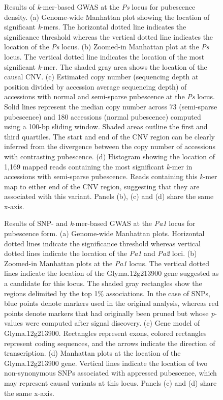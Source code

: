 \documentclass{article}
\begin{document}
\begin{figure}[p]
	\caption[Results of \textit{k}-mer-based GWAS at the
	\textit{Ps} locus for pubescence density.]{Results of \textit{k}-mer-based GWAS at the
	\textit{Ps} locus for pubescence density.
	(a) Genome-wide Manhattan plot showing the location of significant \textit{k}-mers. The
	horizontal dotted line indicates the significance threshold whereas the
	vertical dotted line indicates the location of the \textit{Ps} locus.
	(b) Zoomed-in Manhattan plot at the \textit{Ps} locus. The
	vertical dotted line indicates the location of the most significant
	\textit{k}-mer. The shaded gray area shows the location of the causal CNV.
	(c) Estimated copy number (sequencing depth at position divided by
	accession average sequencing depth) of accessions with normal and
	semi-sparse pubescence at the \textit{Ps} locus. Solid lines represent
	the median copy number across 73 (semi-sparse pubescence) and 180
	accessions (normal pubescence) computed using a 100-bp sliding window.
	Shaded areas outline the first and third quartiles. The start and end
	of the CNV region can be clearly inferred from the divergence between
	the copy number of accessions with contrasting pubescence.
	(d) Histogram showing the location of 1,169 mapped reads containing the
	most significant \textit{k}-mer in accessions with semi-sparse pubescence.
	Reads containing this \textit{k}-mer map to either end of the CNV
	region, suggesting that they are associated with this variant. Panels
	(b), (c) and (d) share the same x-axis.}
	\label{pubescence-density-main-figure}
\end{figure}

\begin{figure}[p]
	\caption{Results of SNP- and \textit{k}-mer-based GWAS at the
	\textit{Pa1} locus for pubescence form. (a) Genome-wide Manhattan plots.
	Horizontal dotted lines indicate the significance
	threshold whereas vertical dotted lines indicate the location of the
	\textit{Pa1} and \textit{Pa2} loci. (b) Zoomed-in Manhattan plots at the \textit{Pa1} locus.
	The vertical dotted lines indicate the location of the
	Glyma.12g213900 gene suggested as a candidate for this locus. The shaded gray
	rectangles show the regions delimited by the top 1\% associations.
	In the case of SNPs, blue points denote markers used in the
	original analysis, whereas red points denote markers that had originally
	been pruned but whose \emph{p}-values were computed after signal
	discovery.
	(c) Gene model of Glyma.12g213900. Rectangles represent exons, colored
	rectangles represent coding sequences, and the arrows indicate the
	direction of transcription.
	(d) Manhattan plots at the location of the Glyma.12g213900 gene.
	Vertical lines indicate the location of two non-synonymous
	SNPs associated with appressed pubescence, which may represent causal variants
	at this locus. Panels (c) and (d) share the same x-axis.}
	\label{pubescence-form-main-figure}
\end{figure}
\end{document}
